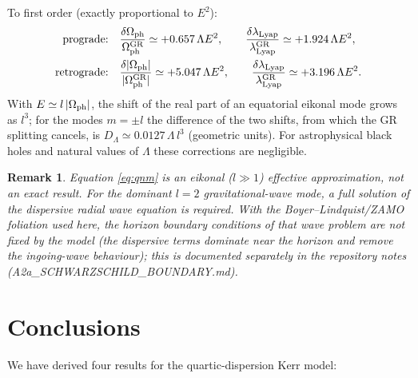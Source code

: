 \documentclass[12pt,a4paper]{article}
\newtheorem{remark}{Remark}
\newcommand{\Omph}{\Omega_{\rm ph}}
\newcommand{\lLyap}{\lambda_{\rm Lyap}}
\begin{document}
To first order (exactly proportional to $E^2$):
\begin{equation}\label{eq:qnmcorr}
\begin{aligned}
  \text{prograde:}\quad &\frac{\delta\Omph}{\Omph^{\rm GR}} \simeq +0.657\,\Lambda E^2,\qquad
  \frac{\delta\lLyap}{\lLyap^{\rm GR}} \simeq +1.924\,\Lambda E^2,\\
  \text{retrograde:}\quad &\frac{\delta|\Omph|}{|\Omph^{\rm GR}|} \simeq +5.047\,\Lambda E^2,\qquad
  \frac{\delta\lLyap}{\lLyap^{\rm GR}} \simeq +3.196\,\Lambda E^2.
\end{aligned}
\end{equation}
With $E\simeq l\,|\Omph|$, the shift of the real part of an equatorial eikonal mode
grows as $l^3$; for the modes $m=\pm l$ the difference of the two shifts, from
which the GR splitting cancels, is $D_\Lambda\simeq0.0127\,\Lambda\,l^3$ (geometric
units). For astrophysical black holes and natural values of $\Lambda$ these
corrections are negligible.

\begin{remark}
Equation \eqref{eq:qnm} is an eikonal ($l\gg 1$) effective
approximation, not an exact result. For the dominant $l=2$
gravitational-wave mode, a full solution of the dispersive radial
wave equation is required. With the Boyer--Lindquist/ZAMO foliation
used here, the horizon boundary conditions of that wave problem are not
fixed by the model (the dispersive terms dominate near the horizon and
remove the ingoing-wave behaviour); this is documented separately in the
repository notes (A2a\_SCHWARZSCHILD\_BOUNDARY.md).
\end{remark}

\section{Conclusions}

We have derived four results for the quartic-dispersion Kerr model:
\end{document}
